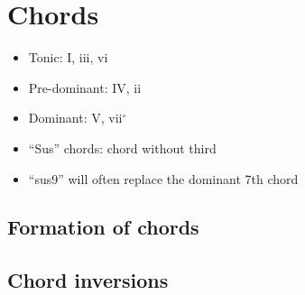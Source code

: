 \documentclass{article}
\begin{document}
\begin{figure}[h!]
	\centering
	\hspace*{-1cm}
	\scalebox{0.7}{}
	\caption{ }
	\label{fig:blues_penta_mineur}
\end{figure}

\newpage
\section{Chords}

\begin{itemize}
	\item Tonic: I, iii, vi 
	\item Pre-dominant: IV, ii
	\item Dominant: V, vii$^\circ$
\end{itemize}


\begin{itemize}
	\item ``Sus'' chords: chord without third
	\item ``sus9'' will often replace the dominant 7th chord
\end{itemize}

\newpage
\subsection{Formation of chords}




\newpage
\subsection{Chord inversions}
\end{document}
